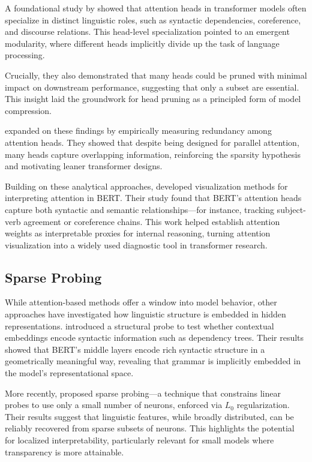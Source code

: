 A foundational study by \citet{voita2019analyzing} showed that attention heads in transformer models often specialize in distinct linguistic roles, such as syntactic dependencies, coreference, and discourse relations. This head-level specialization pointed to an emergent modularity, where different heads implicitly divide up the task of language processing.

Crucially, they also demonstrated that many heads could be pruned with minimal impact on downstream performance, suggesting that only a subset are essential. This insight laid the groundwork for head pruning as a principled form of model compression.

\citet{michel2019sixteen} expanded on these findings by empirically measuring redundancy among attention heads. They showed that despite being designed for parallel attention, many heads capture overlapping information, reinforcing the sparsity hypothesis and motivating leaner transformer designs.

Building on these analytical approaches, \citet{clark2019does} developed visualization methods for interpreting attention in BERT. Their study found that BERT’s attention heads capture both syntactic and semantic relationships—for instance, tracking subject-verb agreement or coreference chains. This work helped establish attention weights as interpretable proxies for internal reasoning, turning attention visualization into a widely used diagnostic tool in transformer research.

\subsection{Sparse Probing}

While attention-based methods offer a window into model behavior, other approaches have investigated how linguistic structure is embedded in hidden representations. \citet{hewitt2019structural} introduced a structural probe to test whether contextual embeddings encode syntactic information such as dependency trees. Their results showed that BERT's middle layers encode rich syntactic structure in a geometrically meaningful way, revealing that grammar is implicitly embedded in the model's representational space.

More recently, \citet{gurnee2023finding} proposed sparse probing—a technique that constrains linear probes to use only a small number of neurons, enforced via $L_0$ regularization. Their results suggest that linguistic features, while broadly distributed, can be reliably recovered from sparse subsets of neurons. This highlights the potential for localized interpretability, particularly relevant for small models where transparency is more attainable.

